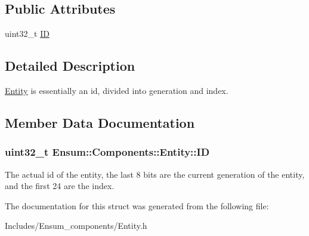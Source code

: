 \subsection*{Public Attributes}
\begin{DoxyCompactItemize}
\item 
uint32\+\_\+t \hyperlink{struct_ensum_1_1_components_1_1_entity_a89fe2a4a8002457a754b7ba63804bf2a}{ID}
\end{DoxyCompactItemize}


\subsection{Detailed Description}
\hyperlink{struct_ensum_1_1_components_1_1_entity}{Entity} is essentially an id, divided into generation and index. 

\subsection{Member Data Documentation}
\subsubsection[{\texorpdfstring{ID}{ID}}]{\setlength{\rightskip}{0pt plus 5cm}uint32\+\_\+t Ensum\+::\+Components\+::\+Entity\+::\+ID}\hypertarget{struct_ensum_1_1_components_1_1_entity_a89fe2a4a8002457a754b7ba63804bf2a}{}\label{struct_ensum_1_1_components_1_1_entity_a89fe2a4a8002457a754b7ba63804bf2a}
The actual id of the entity, the last 8 bits are the current generation of the entity, and the first 24 are the index. 

The documentation for this struct was generated from the following file\+:\begin{DoxyCompactItemize}
\item 
Includes/\+Ensum\+\_\+components/Entity.\+h\end{DoxyCompactItemize}
